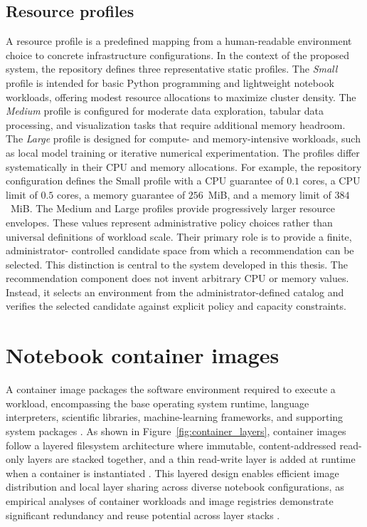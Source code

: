\subsection{Resource profiles}

A resource profile is a predefined mapping from a human-readable environment choice to concrete infrastructure configurations. In the context of the proposed system, the repository defines three representative static profiles. The \emph{Small} profile is intended for basic Python programming and lightweight notebook workloads, offering modest resource allocations to maximize cluster density. The \emph{Medium} profile is configured for moderate data exploration, tabular data processing, and visualization tasks that require additional memory headroom. The \emph{Large} profile is designed for compute- and memory-intensive workloads, such as local model training or iterative numerical experimentation. The profiles differ systematically in their CPU and memory allocations. For example, the repository configuration defines the Small profile with a CPU guarantee of \(0.1\) cores, a CPU limit of \(0.5\) cores, a memory guarantee of \(256\)~MiB, and a memory limit of \(384\)~MiB. The Medium and Large profiles provide progressively larger resource envelopes. These values represent administrative policy choices rather than universal definitions of workload scale. Their primary role is to provide a finite, administrator- controlled candidate space from which a recommendation can be selected. This distinction is central to the system developed in this thesis. The recommendation component does not invent arbitrary CPU or memory values. Instead, it selects an environment from the administrator-defined catalog and verifies the selected candidate against explicit policy and capacity constraints.

\section{Notebook container images}

A container image packages the software environment required to execute a workload, encompassing the base operating system runtime, language interpreters, scientific libraries, machine-learning frameworks, and supporting system packages \cite{oci}. As shown in Figure~\ref{fig:container_layers}, container images follow a layered filesystem architecture where immutable, content-addressed read-only layers are stacked together, and a thin read-write layer is added at runtime when a container is instantiated \cite{dockerlayers}. This layered design enables efficient image distribution and local layer sharing across diverse notebook configurations, as empirical analyses of container workloads and image registries demonstrate significant redundancy and reuse potential across layer stacks \cite{anwar,harter}.

